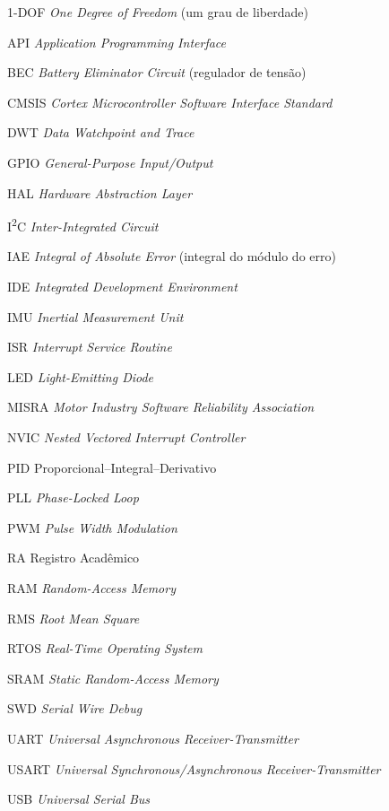 \renewcommand{\listadesiglasname}{LISTA DE SIGLAS}
\begin{siglas}
 \item[1-DOF] \textit{One Degree of Freedom} (um grau de liberdade)
 \item[API] \textit{Application Programming Interface}
 \item[BEC] \textit{Battery Eliminator Circuit} (regulador de tensão)
 \item[CMSIS] \textit{Cortex Microcontroller Software Interface Standard}
 \item[DWT] \textit{Data Watchpoint and Trace}
 \item[GPIO] \textit{General-Purpose Input/Output}
 \item[HAL] \textit{Hardware Abstraction Layer}
 \item[I\textsuperscript{2}C] \textit{Inter-Integrated Circuit}
 \item[IAE] \textit{Integral of Absolute Error} (integral do módulo do erro)
 \item[IDE] \textit{Integrated Development Environment}
 \item[IMU] \textit{Inertial Measurement Unit}
 \item[ISR] \textit{Interrupt Service Routine}
 \item[LED] \textit{Light-Emitting Diode}
 \item[MISRA] \textit{Motor Industry Software Reliability Association}
 \item[NVIC] \textit{Nested Vectored Interrupt Controller}
 \item[PID] Proporcional--Integral--Derivativo
 \item[PLL] \textit{Phase-Locked Loop}
 \item[PWM] \textit{Pulse Width Modulation}
 \item[RA] Registro Acadêmico
 \item[RAM] \textit{Random-Access Memory}
 \item[RMS] \textit{Root Mean Square}
 \item[RTOS] \textit{Real-Time Operating System}
 \item[SRAM] \textit{Static Random-Access Memory}
 \item[SWD] \textit{Serial Wire Debug}
 \item[UART] \textit{Universal Asynchronous Receiver-Transmitter}
 \item[USART] \textit{Universal Synchronous/Asynchronous Receiver-Transmitter}
 \item[USB] \textit{Universal Serial Bus}
\end{siglas}

